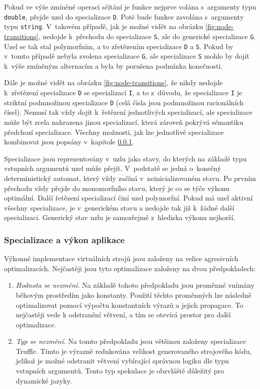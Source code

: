 \documentclass[
  master,
  biblatex,
  figures=true,
  theorems,
  sourcecodes,
  glossaries,
  index
]{kidiplom}
\begin{document}
Pokud ve výše zmíněné operaci sčítání je funkce nejprve volána s~argumenty typu \texttt{double}, přejde uzel do specializace \texttt{D}. Poté bude funkce zavolána s~argumenty typu \texttt{string}. V~takovém případě, jak je možné vidět na obrázku \ref{fig:node-transitions}, nedojde k~přechodu do specializace \texttt{S}, ale do generické specializace \texttt{G}. Uzel se tak stal polymorfním, a to zřetězením specializace \texttt{D} a \texttt{S}. Pokud by v~tomto případě nebyla zvolena specializace \texttt{G}, ale specializace \texttt{S} mohlo by dojít k~výše zmíněným alternacím a byla by porušena podmínka konečnosti. 


Dále je možné vidět na obrázku \ref{fig:node-transitions}, že nikdy nedojde k~zřetězení specializace \texttt{D} se specializací \texttt{I}, a to z~důvodu, že specializace \texttt{I} je striktní podmnožinou specializace \texttt{D} (celá čísla jsou podmnožinou racionálních čísel). Nemusí tak vždy dojít k~řetězení jednotlivých specializací, ale specializace může být zcela nahrazena jinou specializací, která zároveň pokrývá sémantiku předchozí specializace. Všechny možnosti, jak lze jednotlivé specializace kombinovat jsou popsány v~kapitole \ref{specializations-and-performance}. 


Specializace jsou reprezentovány v~uzlu jako stavy, do kterých na základě typu vstupních argumentů uzel může přejít. V~podstatě se jedná o~konečný deterministický automat, který vždy začíná v~neinicializovaném stavu. Po prvním přechodu vždy přejde do monomorfního stavu, který je co se týče výkonu optimální. Další řetězení specializací činí uzel polymorfní. Pokud má uzel aktivní všechny specializace, je v~generickém stavu a nedojde tak již k~žádné další specializaci. Generický stav uzlu je samozřejmě z~hlediska výkonu nejhorší. 


\subsubsection{Specializace a výkon aplikace}
\label{specializations-and-performance}
Výkonné implementace virtuálních strojů jsou založeny na velice agresivních optimalizacích. Nejčastěji jsou tyto optimalizace založeny na dvou předpokladech: 

\begin{enumerate}
    \item \textit{Hodnota se nezmění.} Na základě tohoto předpokladu jsou proměnné vnímány běhovým prostředím jako konstanty. Použití těchto proměnných lze následně optimalizovat pomocí výpočtu konstantních výrazů a jejich propagace. To nejčastěji vede k odstranění větvení, a tím se otevírá prostor pro další optimalizace.
    \item \textit{Typ se nezmění.} Na tomto předpokladu jsou většinou založeny specializace Truffle. Tímto je výrazně redukována velikost generovaného strojového kódu, jelikož je možné odstranit větvení vybírající správnou logiku dle typu vstupních argumentů. Tento typ spekulace je obzvláště důležitý pro dynamické jazyky. 
\end{enumerate}
\end{document}
